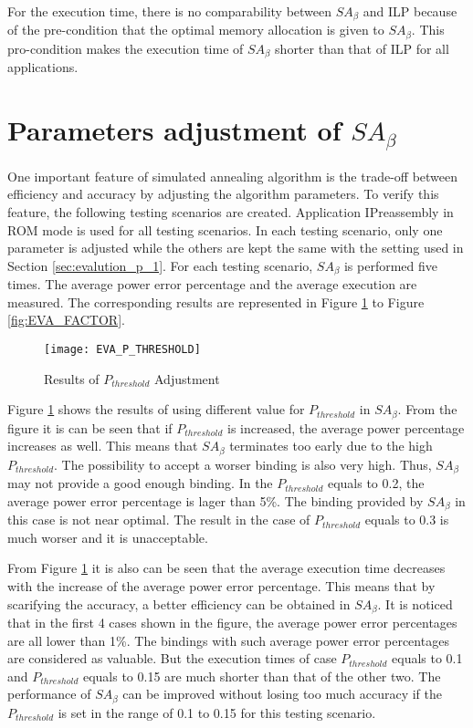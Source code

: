 	For the execution time, there is no comparability between $SA_{\beta}$
	and ILP because of the pre-condition that the optimal memory allocation is
	given to $SA_{\beta}$. This pro-condition makes the execution time
	of $SA_{\beta}$ shorter than that of ILP for all applications.
	
	\section{Parameters adjustment of $SA_{\beta}$}
	\label{sec:evalution_p_2}
	One important feature of simulated annealing algorithm is the trade-off
	between efficiency and accuracy by adjusting the algorithm parameters.
	To verify this feature, the following testing scenarios are created.
	Application IPreassembly in ROM mode is used for all testing scenarios.
	In each testing scenario, only one parameter is adjusted while the others
	are kept the same with the setting used in Section \ref{sec:evalution_p_1}. 
	For each testing scenario, $SA_{\beta}$ is performed five times.
	The average power error percentage and the average execution are measured.
	The corresponding results are represented in Figure \ref{fig:EVA_P_THRESHOLD} to
	Figure \ref{fig:EVA_FACTOR}.
	
	\begin{figure}[htb]
		\begin{center}
			\texttt{[image: EVA\_P\_THRESHOLD]}
			\caption{Results of $P_{threshold}$ Adjustment}
			\label{fig:EVA_P_THRESHOLD}
		\end{center}
	\end{figure}

	Figure \ref{fig:EVA_P_THRESHOLD} shows the results of using different value for
	$P_{threshold}$ in $SA_{\beta}$. From the figure it is can be seen that
	if $P_{threshold}$ is increased, the average power percentage increases as well.
	This means that $SA_{\beta}$ terminates too early due to the high $P_{threshold}$.
	The possibility to accept a worser binding is also very high. Thus, $SA_{\beta}$
	may not provide a good enough binding. In the $P_{threshold}$ equals to 0.2,
	the average power error percentage is lager than 5\%. The binding provided by $SA_{\beta}$
	in this case is not near optimal. The result in the case of $P_{threshold}$
	equals to 0.3 is much worser and it is unacceptable.
	
	From Figure \ref{fig:EVA_P_THRESHOLD} it is also can be seen that the average
	execution time decreases with the increase of the average power error percentage.
	This means that by scarifying the accuracy, a better efficiency can be obtained in $SA_{\beta}$.
	It is noticed that in the first 4 cases shown in the figure, the average power error
	percentages are all lower than 1\%. The bindings with such average power error
	percentages are considered as valuable. But the execution times of case $P_{threshold}$
	equals to 0.1 and $P_{threshold}$ equals to 0.15 are much shorter than that of
	the other two. The performance of $SA_{\beta}$ can be improved without losing
	too much accuracy if the $P_{threshold}$ is set in the range of 0.1 to 0.15 for
	this testing scenario.
	
